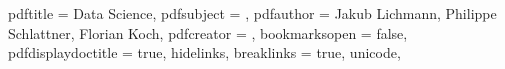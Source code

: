 

\hypersetup
{
pdftitle = {Data Science},
pdfsubject = {},
pdfauthor = {Jakub Lichmann, Philippe Schlattner, Florian Koch},
pdfcreator = {},
bookmarksopen = false,
pdfdisplaydoctitle = true,
hidelinks,
breaklinks = true,
unicode,
}

